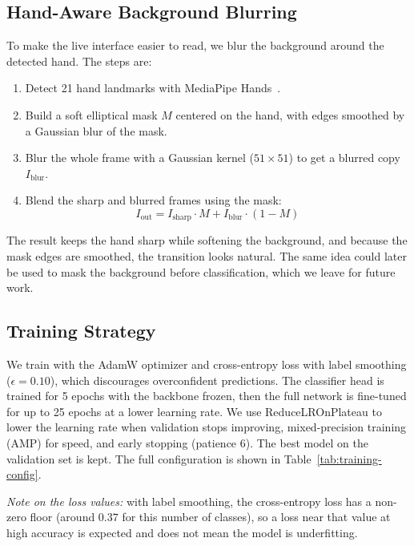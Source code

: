 \subsection{Hand-Aware Background Blurring}
To make the live interface easier to read, we blur the background around the
detected hand. The steps are:
\begin{enumerate}
  \item Detect 21 hand landmarks with MediaPipe Hands~\cite{lugaresi2019mediapipe}.
  \item Build a soft elliptical mask $M$ centered on the hand, with edges smoothed by
        a Gaussian blur of the mask.
  \item Blur the whole frame with a Gaussian kernel ($51 \times 51$) to get a blurred
        copy $I_{\text{blur}}$.
  \item Blend the sharp and blurred frames using the mask:
        \begin{equation}
          I_{\text{out}} = I_{\text{sharp}} \cdot M + I_{\text{blur}} \cdot (1 - M)
        \end{equation}
\end{enumerate}
The result keeps the hand sharp while softening the background, and because the mask
edges are smoothed, the transition looks natural. The same idea could later be used
to mask the background before classification, which we leave for future work.

\subsection{Training Strategy}
We train with the AdamW optimizer and cross-entropy loss with label smoothing
($\epsilon = 0.10$), which discourages overconfident predictions. The classifier head
is trained for 5 epochs with the backbone frozen, then the full network is fine-tuned
for up to 25 epochs at a lower learning rate. We use ReduceLROnPlateau to lower the
learning rate when validation stops improving, mixed-precision training (AMP) for
speed, and early stopping (patience 6). The best model on the validation set is kept.
The full configuration is shown in Table~\ref{tab:training-config}.

\textit{Note on the loss values:} with label smoothing, the cross-entropy loss has a
non-zero floor (around $0.37$ for this number of classes), so a loss near that value
at high accuracy is expected and does not mean the model is underfitting.